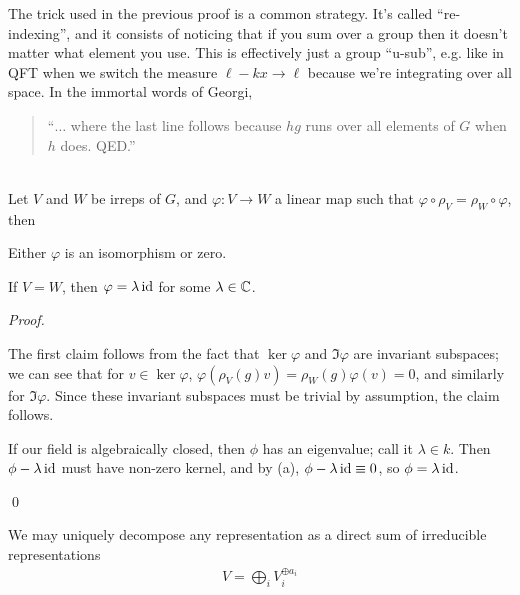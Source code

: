 \documentclass[11pt]{article}
\begin{document}
\begin{nnote}
    The trick used in the previous proof is a common strategy.
    It's called ``re-indexing'', and it consists of
    noticing that if you sum over a group then it doesn't matter what 
    element you use. This is effectively just a group ``u-sub'', e.g. like
    in QFT when we switch the measure $\ell - kx \to \ell$ because we're integrating
    over all space. In the immortal words of Georgi,
    \begin{quote}
        ``$\ldots$ where the last line follows because $hg$ runs over all
        elements of $G$ when $h$ does. QED.''
    \end{quote}
\end{nnote}

\begin{theorem}{}\\
    Let $V$ and $W$ be irreps of $G$, and $\varphi \colon V \to W$
    a linear map such that $ \varphi \circ \rho_V = \rho_W \circ \varphi$, 
    then
    \begin{alphamerate}
        \item Either $\varphi$ is an isomorphism or zero.
        \item If $V = W$, then $\varphi = \lambda \operatorname{id}$ for some $\lambda \in \mathbb{C}$.
    \end{alphamerate}
\end{theorem}

\begin{proof}
    \begin{alphamerate}
        \item The first claim follows from the fact that $\ker{\varphi}$
        and $\Im{\varphi}$ are invariant subspaces; we can see that for
        $v \in \ker{\varphi}$, $\varphi(\rho_V(g) v) = \rho_W(g) \varphi(v) = 0$,
        and similarly for $\Im{\varphi}$. Since these invariant subspaces
        must be trivial by assumption, the claim follows.
        \item If our field is algebraically closed, then $\phi$ has an eigenvalue;
        call it $\lambda \in k$. Then $\phi - \lambda \operatorname{id}$ must have non-zero kernel,
        and by (a), $\phi - \lambda \operatorname{id} \equiv 0$, so $\phi = \lambda \operatorname{id}$.
    \end{alphamerate}
    \qed
\end{proof}

\begin{corollary}
    We may uniquely decompose any representation as a direct
    sum of irreducible representations
    \begin{align*}
        V = \bigoplus_i V_i^{\oplus a_i}
    \end{align*}
\end{corollary}
\end{document}
